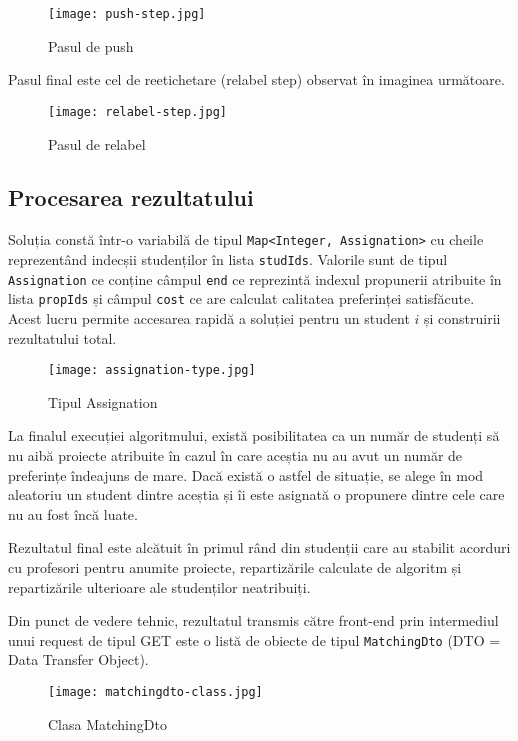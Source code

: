 \begin{figure}[H]
	\centering
	\texttt{[image: push-step.jpg]}
	\caption{Pasul de push}
\end{figure}

Pasul final este cel de reetichetare (relabel step) observat în imaginea următoare.

\begin{figure}[H]
	\centering
	\texttt{[image: relabel-step.jpg]}
	\caption{Pasul de relabel}
\end{figure}

\subsection{Procesarea rezultatului}

Soluția constă într-o variabilă de tipul \texttt{Map<Integer, Assignation>} cu cheile reprezentând indecșii studenților în lista \texttt{studIds}. Valorile sunt de tipul \texttt{Assignation} ce conține câmpul \texttt{end} ce reprezintă indexul propunerii atribuite în lista \texttt{propIds} și câmpul \texttt{cost} ce are calculat calitatea preferinței satisfăcute. Acest lucru permite accesarea rapidă a soluției pentru un student $i$ și construirii rezultatului total.

\begin{figure}[H]
	\centering
	\texttt{[image: assignation-type.jpg]}
	\caption{Tipul Assignation}
\end{figure}

La finalul execuției algoritmului, există posibilitatea ca un număr de studenți să nu aibă proiecte atribuite în cazul în care aceștia nu au avut un număr de preferințe îndeajuns de mare. Dacă există o astfel de situație, se alege în mod aleatoriu un student dintre aceștia și îi este asignată o propunere dintre cele care nu au fost încă luate.

Rezultatul final este alcătuit în primul rând din studenții care au stabilit acorduri cu profesori pentru anumite proiecte, repartizările calculate de algoritm și repartizările ulterioare ale studenților neatribuiți.

Din punct de vedere tehnic, rezultatul transmis către front-end prin intermediul unui request de tipul GET este o listă de obiecte de tipul \texttt{MatchingDto} (DTO = Data Transfer Object).

\begin{figure}[H]
	\centering
	\texttt{[image: matchingdto-class.jpg]}
	\caption{Clasa MatchingDto}
\end{figure}

